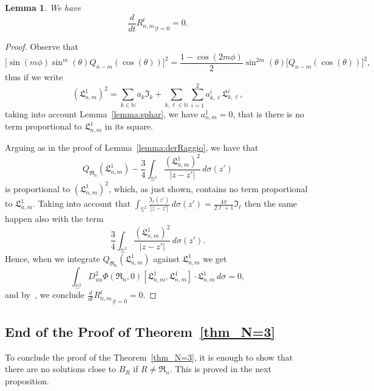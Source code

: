 \documentclass[10pt,reqno,english]{amsart}
\newcommand{\Sd}{\mathbb{S}^2}
\newcommand{\rn}{{\mathfrak R}_n  }
\newcommand{\N}{\mathbb{N}}
\newtheorem{lemma}{Lemma}[section]
\theoremstyle{definition}
\numberwithin{equation}{section}
\begin{document}
\begin{lemma}
We have
\[
\frac{d}{dt}{R_{n,m}^t}_{|t=0}=0.
\]
\end{lemma}
\begin{proof}
Observe that
\[
\big[\sin(m\phi)\sin^m(\theta)Q_{n-m}(\cos(\theta))\big]^2=\frac{1-\cos(2m\phi)}{2}\sin^{2m}(\theta)\big[Q_{n-m}(\cos(\theta))\big]^2,
\]
thus if we write
\[
(\mathfrak L_{n,m}^1)^2=\sum_{k\in\N}a_{k}\mathfrak I_k+\sum_{k,\ell\in\N}\sum_{i=1}^2a^i_{k,\ell}\mathfrak L_{k,\ell}^i,
\]
taking into account Lemma~\ref{lemma:sphar}, we have $a^1_{n,m}=0$, that is  there is no term proportional to $\mathfrak L_{n,m}^1$ in its square.


Arguing as in the proof of Lemma~\ref{lemma:derRaggio}, we have that
\[
Q_{\rn}(\mathfrak L_{n,m}^1)-\frac34\int_{\Sd}\frac{(\mathfrak L_{n,m}^1)^2}{|z-z'|}\,d\sigma(z')
\]
is proportional to $(\mathfrak L_{n,m}^1)^2$, which, as just shown, contains no term proportional to $\mathfrak L_{n,m}^1$. Taking into account that $\int_{\Sd}\frac{\mathfrak I_\ell(z')}{|z-z'|}\,d\sigma(z')=\frac{4\pi}{2\ell+1}\mathfrak I_\ell$ then the same happen also with the term
\[
\frac34\int_{\Sd}\frac{(\mathfrak L_{n,m}^1)^2}{|z-z'|}\,d\sigma(z').
\]
Hence, when we integrate $Q_{\rn}(\mathfrak L_{n,m}^1)$ against $\mathfrak L_{n,m}^1$ we get
\[
\int_{\Sd} D^2_{uu}\Phi(\rn,0)[\mathfrak L_{n,m}^1,\mathfrak L_{n,m}^1]\cdot\mathfrak L_{n,m}^1\,d\sigma=0,
\]
and by~\cite[formula (I.6.3)]{KieBook}, we conclude $\frac{d}{dt}{R_{n,m}^t}_{|t=0}=0$.
\end{proof}


\subsection{End of the Proof of Theorem\texorpdfstring{~\ref{thm_N=3}}{ 1}}
To conclude the proof of the Theorem~\ref{thm_N=3}, it is enough to show that there are no solutions close to $B_R$ if $R\not=\rn$. This is proved in the next proposition.
\end{document}
